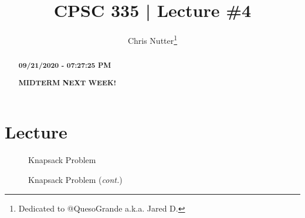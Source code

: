\documentclass[12pt,a4paper]{article}
\title{CPSC 335 | Lecture \#4}
\author{Chris Nutter\thanks{Dedicated to @QuesoGrande a.k.a. Jared D.}}
\begin{document}
\maketitle

\begin{abstract}
    \noindent
    \begin{center}\textbf{09/21/2020 - 07:27:25 PM}\end{center}
        \textbf{MIDTERM NEXT WEEK!}\\
\end{abstract}

\tableofcontents


\section{Lecture}
    
    \begin{figure}[!hbtp]
        \centering
        \caption{Knapsack Problem}
    \end{figure}

    \begin{figure}[!hbtp]
        \centering
        \caption{Knapsack Problem (\emph{cont.})}
    \end{figure}
\end{document}
